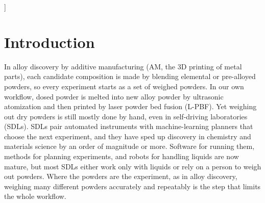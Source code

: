 \documentclass[twoside,twocolumn,9pt]{article}
\begin{document}
  ]

\renewcommand*\rmdefault{bch}\normalfont\upshape
\rmfamily
\section*{}
\vspace{-1cm}







\section{Introduction}

In alloy discovery by additive manufacturing (AM, the 3D printing of metal parts), each candidate composition is made by blending elemental or pre-alloyed powders,\cite{Li2018Combinatorial,Vecchio2021Throughput,Moorehead2020Throughput,Mooraj2024Additive,Nelaturu2024Multi} so every experiment starts as a set of weighed powders. In our own workflow, dosed powder is melted into new alloy powder by ultrasonic atomization and then printed by laser powder bed fusion (L-PBF). Yet weighing out dry powders is still mostly done by hand, even in self-driving laboratories (SDLs). SDLs pair automated instruments with machine-learning planners that choose the next experiment, and they have sped up discovery in chemistry and materials science by an order of magnitude or more.\cite{Abolhasani2023Rise,Tom2024Self,Szymanski2023Autonomous,Seifrid2022Autonomous} Software for running them,\cite{Fei2024Alabos,Guzik2023Decade} methods for planning experiments,\cite{Baird2026Honegumi} and robots for handling liquids are now mature, but most SDLs either work only with liquids or rely on a person to weigh out powders.\cite{Maffettone2023What,Canty2025Science} Where the powders are the experiment, as in alloy discovery, weighing many different powders accurately and repeatably is the step that limits the whole workflow.
\end{document}
